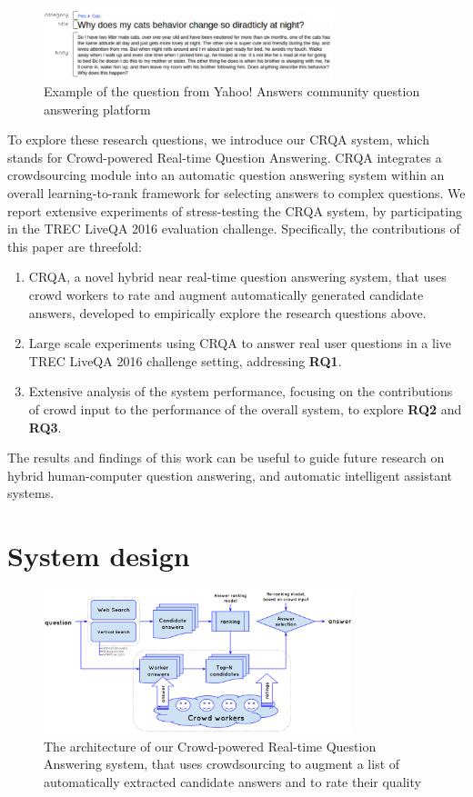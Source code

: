 \documentclass[letterpaper]{article}
\begin{document}
\begin{figure}[h!t]
	\centering
	\includegraphics[width=0.75\textwidth]{img/ya_question}
	\caption{Example of the question from Yahoo! Answers community question answering platform}
	\label{fig:ya_question}
\end{figure}

To explore these research questions, we introduce our CRQA system, which stands for Crowd-powered Real-time Question Answering.
CRQA integrates a crowdsourcing module into an automatic question answering system within an overall learning-to-rank framework for selecting answers to complex questions.
We report extensive experiments of stress-testing the CRQA system, by participating in the TREC LiveQA 2016 evaluation challenge.
Specifically, the contributions of this paper are threefold:
\begin{enumerate}
	\item CRQA, a novel hybrid near real-time question answering system, that uses crowd workers to rate and augment automatically generated candidate answers, developed to empirically explore the research questions above.
	\item Large scale experiments using CRQA to answer real user questions in a live TREC LiveQA 2016 challenge setting, addressing \textbf{RQ1}.
	\item Extensive analysis of the system performance, focusing on the contributions of crowd input to the performance of the overall system, to explore \textbf{RQ2} and \textbf{RQ3}.
\end{enumerate}

The results and findings of this work can be useful to guide future research on hybrid human-computer question answering, and automatic intelligent assistant systems.

\section{System design}
\label{sec:system}

\begin{figure}[h!t]
	\centering
	\includegraphics[width=0.8\textwidth]{img/system}
	\caption{The architecture of our Crowd-powered Real-time Question Answering system, that uses crowdsourcing to augment a list of automatically extracted candidate answers and to rate their quality}
	\label{fig:system}
\end{figure}
\end{document}
